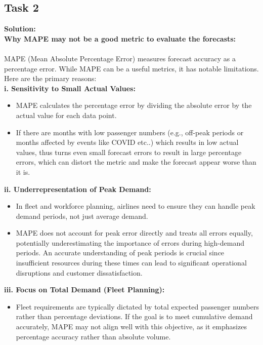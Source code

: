 \documentclass[12pt]{article}
\begin{document}
\subsection{Task 2}
\textbf{Solution: } \newline
\\
\textbf{Why MAPE may not be a good metric to evaluate the forecasts:}\\
\\
MAPE (Mean Absolute Percentage Error) measures forecast accuracy as a percentage error. While MAPE can be a useful metrics, it has notable limitations. Here are the primary reasons:
\\
\textbf{i. Sensitivity to Small Actual Values:}
\begin{itemize}
    \item MAPE calculates the percentage error by dividing the absolute error by the actual value for each data point.
    \item  If there are months with low passenger numbers (e.g., off-peak periods or months affected by events like COVID etc..) which results in low actual values, thus turns even small forecast errors to result in large percentage errors, which can distort the metric and make the forecast appear worse than it is.
\end{itemize}
\textbf{ii. Underrepresentation of Peak Demand:}
\begin{itemize}
    \item In fleet and workforce planning, airlines need to ensure they can handle peak demand periods, not just average demand.
    \item MAPE does not account for peak error directly and treats all errors equally, potentially underestimating the importance of errors during high-demand periods. An accurate understanding of peak periods is crucial since insufficient resources during these times can lead to significant operational disruptions and customer dissatisfaction.
\end{itemize}
\textbf{iii. Focus on Total Demand (Fleet Planning):}
\begin{itemize}
    \item Fleet requirements are typically dictated by total expected passenger numbers rather than percentage deviations. If the goal is to meet cumulative demand accurately, MAPE may not align well with this objective, as it emphasizes percentage accuracy rather than absolute volume.
\end{itemize}
\end{document}
